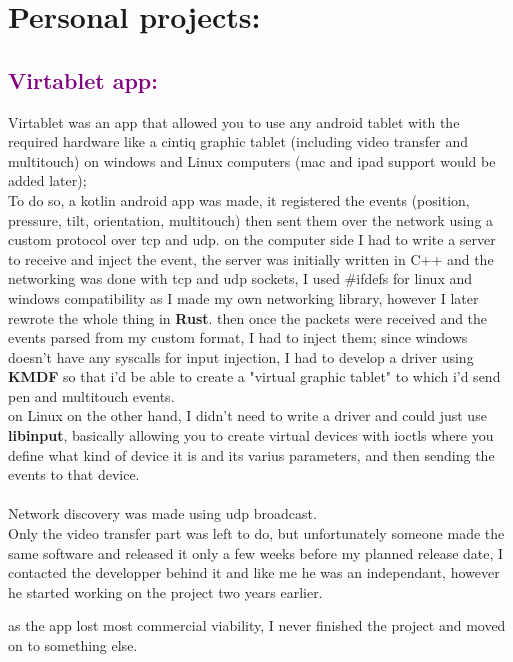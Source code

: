 \documentclass[a4paper,10pt]{article}
\begin{document}
\section*{Personal projects:}
\begin{spacing}{1}
	\subsection*{\textcolor{purple}{Virtablet app:}}
	Virtablet was an app that allowed you to use any android tablet with the required hardware like a cintiq graphic tablet (including video transfer and multitouch) on windows and Linux computers
	(mac and ipad support would be added later);\\

	To do so, a kotlin android app was made, it registered the events (position, pressure, tilt, orientation, multitouch) then sent them over the network using a custom protocol over tcp and udp.
	on the computer side I had to write a server to receive and inject the event, the server was initially written in C++ and the networking was done with tcp and udp sockets, I used \#ifdefs for linux and windows compatibility as I made my own networking library, however I later rewrote the whole thing in \textbf{Rust}.
	then once the packets were received and the events parsed from my custom format, I had to inject them; since windows doesn't have any syscalls for input injection, I had to develop a driver using
	\textbf{KMDF} so that i'd be able to create a "virtual graphic tablet" to which i'd send pen and multitouch events.\\

	on Linux on the other hand, I didn't need to write a driver and could just use \textbf{libinput}, basically allowing you to create virtual devices with ioctls where you define what kind of device it is and its varius parameters, and then sending the events to that device.
	\\
	\\
	Network discovery was made using udp broadcast.\\

	Only the video transfer part was left to do, but unfortunately someone made the same software and released it only a few weeks before my planned release date, I contacted the developper behind it
	and like me he was an independant, however he started working on the project two years earlier.

	\noindent as the app lost most commercial viability, I never finished the project and moved on to something else.


\end{spacing}
\end{document}

